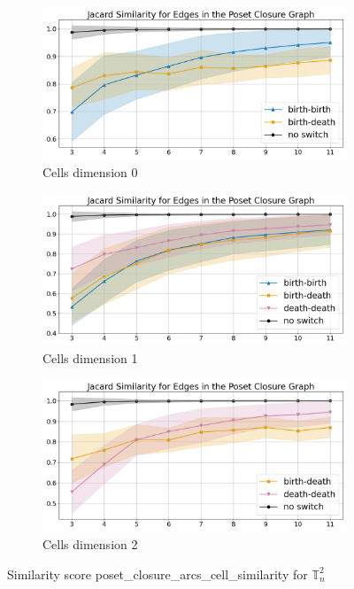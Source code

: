 \documentclass{article}
\begin{document}
\begin{figure}[htbp]
\centering
\begin{subfigure}[b]{0.3\textwidth}
    \includegraphics[width=\linewidth]{pics/torus-transpositions-extended/score-poset-closure-arcs-cell-similarity-complex-dim2-transpositions-dim0.png}
    \caption{Cells dimension 0}
    \label{fig:posetclosurearcscellsimilaritycomplex2cells0}
\end{subfigure}
\hfill
\begin{subfigure}[b]{0.3\textwidth}
    \includegraphics[width=\linewidth]{pics/torus-transpositions-extended/score-poset-closure-arcs-cell-similarity-complex-dim2-transpositions-dim1.png}
    \caption{Cells dimension 1}
    \label{fig:posetclosurearcscellsimilaritycomplex2cells1}
\end{subfigure}
\hfill
\begin{subfigure}[b]{0.3\textwidth}
    \includegraphics[width=\linewidth]{pics/torus-transpositions-extended/score-poset-closure-arcs-cell-similarity-complex-dim2-transpositions-dim2.png}
    \caption{Cells dimension 2}
    \label{fig:posetclosurearcscellsimilaritycomplex2cells2}
\end{subfigure}
\caption{Similarity score poset\_closure\_arcs\_cell\_similarity for $\mathbb{T}_n^{2}$}
\label{fig:posetclosurearcscellsimilaritycomplex2}
\end{figure}
\end{document}
